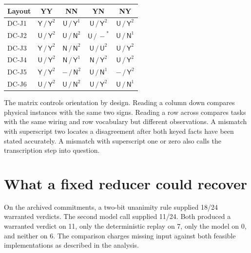\documentclass[12pt,letterpaper]{article}
\begin{document}
\begin{center}{\small\setlength{\tabcolsep}{4pt}\begin{tabularx}{\linewidth}{@{}Ycccc@{}}\toprule
Layout & YY & NN & YN & NY\\ \midrule
DC-J1 & {\color{accent}$\mathsf{Y\,/\, Y}^{2}$} & {\color{ink}$\mathsf{U\,/\, Y}^{1}$} & {\color{ink}$\mathsf{U\,/\, Y}^{2}$} & {\color{ink}$\mathsf{U\,/\, Y}^{2}$}\\
DC-J2 & {\color{ink}$\mathsf{U\,/\, Y}^{2}$} & {\color{ink}$\mathsf{U\,/\, N}^{2}$} & {\color{ink}$\mathsf{U\,/\, -}^{*}$} & {\color{ink}$\mathsf{U\,/\, N}^{1}$}\\
DC-J3 & {\color{accent}$\mathsf{Y\,/\, Y}^{2}$} & {\color{accent}$\mathsf{N\,/\, N}^{2}$} & {\color{accent}$\mathsf{U\,/\, U}^{2}$} & {\color{ink}$\mathsf{U\,/\, Y}^{2}$}\\
DC-J4 & {\color{ink}$\mathsf{U\,/\, Y}^{2}$} & {\color{ink}$\mathsf{N\,/\, Y}^{1}$} & {\color{ink}$\mathsf{N\,/\, Y}^{2}$} & {\color{ink}$\mathsf{U\,/\, Y}^{2}$}\\
DC-J5 & {\color{accent}$\mathsf{Y\,/\, Y}^{2}$} & {\color{ink}$\mathsf{-\,/\, N}^{2}$} & {\color{ink}$\mathsf{U\,/\, N}^{1}$} & {\color{ink}$\mathsf{-\,/\, Y}^{2}$}\\
DC-J6 & {\color{ink}$\mathsf{U\,/\, Y}^{2}$} & {\color{ink}$\mathsf{U\,/\, N}^{2}$} & {\color{ink}$\mathsf{U\,/\, Y}^{2}$} & {\color{ink}$\mathsf{U\,/\, N}^{1}$}\\
\bottomrule\end{tabularx}}\end{center}

The matrix controls orientation by design. Reading a column down compares physical instances with the same two signs. Reading a row across compares tasks with the same wiring and row vocabulary but different observations. A mismatch with superscript two locates a disagreement after both keyed facts have been stated accurately. A mismatch with superscript one or zero also calls the transcription step into question.

\section{What a fixed reducer could recover}

On the archived commitments, a two-bit unanimity rule supplied 18/24 warranted verdicts. The second model call supplied 11/24. Both produced a warranted verdict on 11, only the deterministic replay on 7, only the model on 0, and neither on 6. The comparison charges missing input against both feasible implementations as described in the analysis.
\end{document}
